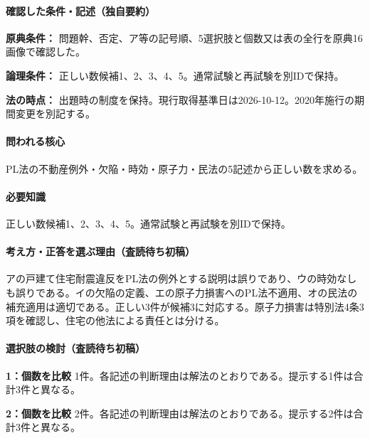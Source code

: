 \paragraph{確認した条件・記述（独自要約）}\mbox{}\par

\noindent\textbf{原典条件：} 問題幹、否定、ア等の記号順、5選択肢と個数又は表の全行を原典16画像で確認した。\par

\noindent\textbf{論理条件：} 正しい数候補1、2、3、4、5。通常試験と再試験を別IDで保持。\par

\noindent\textbf{法の時点：} 出題時の制度を保持。現行取得基準日は2026-10-12。2020年施行の期間変更を別記する。\par

\paragraph{問われる核心} PL法の不動産例外・欠陥・時効・原子力・民法の5記述から正しい数を求める。

\paragraph{必要知識} 正しい数候補1、2、3、4、5。通常試験と再試験を別IDで保持。

\paragraph{考え方・正答を選ぶ理由（査読待ち初稿）} アの戸建て住宅耐震違反をPL法の例外とする説明は誤りであり、ウの時効なしも誤りである。イの欠陥の定義、エの原子力損害へのPL法不適用、オの民法の補充適用は適切である。正しい3件が候補3に対応する。原子力損害は特別法4条3項を確認し、住宅の他法による責任とは分ける。

\paragraph{選択肢の検討（査読待ち初稿）}\mbox{}\par

\noindent\textbf{1：個数を比較} 1件。各記述の判断理由は解法のとおりである。提示する1件は合計3件と異なる。\par

\noindent\textbf{2：個数を比較} 2件。各記述の判断理由は解法のとおりである。提示する2件は合計3件と異なる。\par

